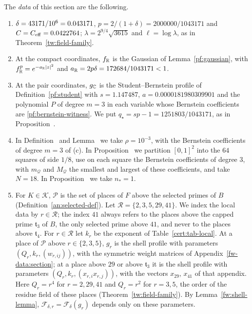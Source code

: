 \begin{definition}\label{cert:data}
The \emph{data} of this section are the following.
\begin{enumerate}
\item[(a)] $\delta=43171/10^6=0.043171$, $p=2/(1+\delta)=2000000/1043171$
 and $C=C_{\rm eff}=0.0422764$; $\lambda=2^{9/4}\sqrt{3615}$ and $\ell=\log\lambda$,
 as in Theorem~\ref{tw:field-family}.
\item[(b)] At the compact coordinates, $f_\mathbb R$ is the Gaussian of
 Lemma~\ref{pf:gaussian}, with $f_\mathbb R^p=e^{-a_\mathbb R|z|^2}$ and
 $a_\mathbb R=2p\delta=172684/1043171<1$.
\item[(c)] At the pair coordinates, $g_\mathbb C$ is the Student--Bernstein
 profile of Definition~\ref{pf:student} with $s=1.147487$,
 $a=0.0000181980309901$ and the polynomial $P$ of degree $m=3$ in each
 variable whose Bernstein coefficients are \eqref{pf:bernstein-witness}. We
 put $q_\star=sp-1=1251803/1043171$, as in Proposition~.
\item[(d)] In Definition~ and Lemma~ we take
 $\rho=10^{-3}$, with the Bernstein coefficients of degree $m=3$ of (c). In
 Proposition~ we partition $[0,1]^2$ into the $64$ squares of
 side $1/8$, use on each square the Bernstein coefficients of degree $3$, with
 $m_{\mathcal Q}$ and $M_{\mathcal Q}$ the smallest and largest of these
 coefficients, and take $N=18$. In Proposition~ we take
 $n_*=1$.
\item[(e)] For $K\in\mathcal K$, $\mathcal P$ is the set of places of $F$
 above the selected primes of $B$ (Definition~\ref{an:selected-def}). Let
 $\mathcal R=\{2,3,5,29,41\}$. We index the local data by $r\in\mathcal R$;
 the index $41$ always refers to the places above the capped prime
 $\mathfrak t_3$ of $B$, the only selected prime above $41$, and never to the
 places above $\mathfrak t_4$. For $r\in\mathcal R$ let $k_r$ be the
 exponent of Table~\ref{cert:tab-local}. At a place of $\mathcal P$ above
 $r\in\{2,3,5\}$, $g_r$ is the shell profile with parameters
 $(Q_r,k_r,(w_{r,ij}))$, with the symmetric weight matrices of
 Appendix~\ref{fw-data:section}; at a place above $29$ or above
 $\mathfrak t_3$ it is the shell profile with parameters
 $(Q_r,k_r,(x_{r,i}x_{r,j}))$, with the vectors $x_{29}$, $x_{41}$ of that
 appendix. Here $Q_r=r^4$ for $r=2,29,41$ and $Q_r=r^2$ for $r=3,5$, the
 order of the residue field of these places (Theorem~\ref{tw:field-family}).
 By Lemma~\ref{fw:shell-lemma}, $\mathcal F_{\delta,r}=\mathcal F_\delta(g_r)$
 depends only on these parameters.
\end{enumerate}
\end{definition}

